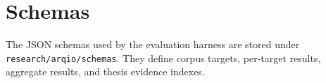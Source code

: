 \chapter{Schemas}

The JSON schemas used by the evaluation harness are stored under \texttt{research/arqio/schemas}. They define corpus targets, per-target results, aggregate results, and thesis evidence indexes.

